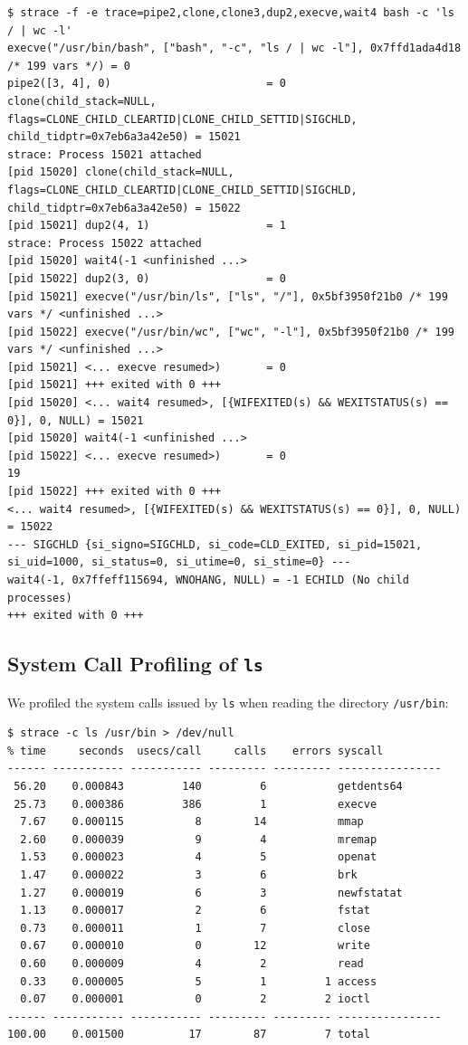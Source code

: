 \documentclass[12pt,a4paper]{article}
\begin{document}
\begin{lstlisting}[style=consolestyle]
$ strace -f -e trace=pipe2,clone,clone3,dup2,execve,wait4 bash -c 'ls / | wc -l'
execve("/usr/bin/bash", ["bash", "-c", "ls / | wc -l"], 0x7ffd1ada4d18 /* 199 vars */) = 0
pipe2([3, 4], 0)                        = 0
clone(child_stack=NULL, flags=CLONE_CHILD_CLEARTID|CLONE_CHILD_SETTID|SIGCHLD, child_tidptr=0x7eb6a3a42e50) = 15021
strace: Process 15021 attached
[pid 15020] clone(child_stack=NULL, flags=CLONE_CHILD_CLEARTID|CLONE_CHILD_SETTID|SIGCHLD, child_tidptr=0x7eb6a3a42e50) = 15022
[pid 15021] dup2(4, 1)                  = 1
strace: Process 15022 attached
[pid 15020] wait4(-1 <unfinished ...>
[pid 15022] dup2(3, 0)                  = 0
[pid 15021] execve("/usr/bin/ls", ["ls", "/"], 0x5bf3950f21b0 /* 199 vars */ <unfinished ...>
[pid 15022] execve("/usr/bin/wc", ["wc", "-l"], 0x5bf3950f21b0 /* 199 vars */ <unfinished ...>
[pid 15021] <... execve resumed>)       = 0
[pid 15021] +++ exited with 0 +++
[pid 15020] <... wait4 resumed>, [{WIFEXITED(s) && WEXITSTATUS(s) == 0}], 0, NULL) = 15021
[pid 15020] wait4(-1 <unfinished ...>
[pid 15022] <... execve resumed>)       = 0
19
[pid 15022] +++ exited with 0 +++
<... wait4 resumed>, [{WIFEXITED(s) && WEXITSTATUS(s) == 0}], 0, NULL) = 15022
--- SIGCHLD {si_signo=SIGCHLD, si_code=CLD_EXITED, si_pid=15021, si_uid=1000, si_status=0, si_utime=0, si_stime=0} ---
wait4(-1, 0x7ffeff115694, WNOHANG, NULL) = -1 ECHILD (No child processes)
+++ exited with 0 +++
\end{lstlisting}

\subsection{System Call Profiling of \texttt{ls}}
We profiled the system calls issued by \texttt{ls} when reading the directory \texttt{/usr/bin}:

\begin{lstlisting}[style=consolestyle]
$ strace -c ls /usr/bin > /dev/null
% time     seconds  usecs/call     calls    errors syscall
------ ----------- ----------- --------- --------- ----------------
 56.20    0.000843         140         6           getdents64
 25.73    0.000386         386         1           execve
  7.67    0.000115           8        14           mmap
  2.60    0.000039           9         4           mremap
  1.53    0.000023           4         5           openat
  1.47    0.000022           3         6           brk
  1.27    0.000019           6         3           newfstatat
  1.13    0.000017           2         6           fstat
  0.73    0.000011           1         7           close
  0.67    0.000010           0        12           write
  0.60    0.000009           4         2           read
  0.33    0.000005           5         1         1 access
  0.07    0.000001           0         2         2 ioctl
------ ----------- ----------- --------- --------- ----------------
100.00    0.001500          17        87         7 total
\end{lstlisting}
\end{document}
